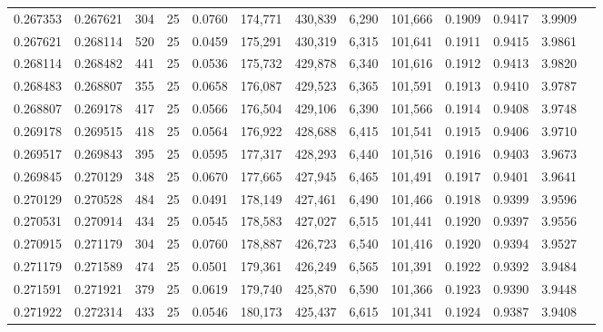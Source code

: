 \begin{tabular}{rrrrrrrrrrrrr}
0.267353 & 0.267621 &   304 &  25 &                                     0.0760 & 174,771 & 430,839 &   6,290 & 101,666 & 0.1909 & 0.9417 & 3.9909 \\
0.267621 & 0.268114 &   520 &  25 &                                     0.0459 & 175,291 & 430,319 &   6,315 & 101,641 & 0.1911 & 0.9415 & 3.9861 \\
0.268114 & 0.268482 &   441 &  25 &                                     0.0536 & 175,732 & 429,878 &   6,340 & 101,616 & 0.1912 & 0.9413 & 3.9820 \\
0.268483 & 0.268807 &   355 &  25 &                                     0.0658 & 176,087 & 429,523 &   6,365 & 101,591 & 0.1913 & 0.9410 & 3.9787 \\
0.268807 & 0.269178 &   417 &  25 &                                     0.0566 & 176,504 & 429,106 &   6,390 & 101,566 & 0.1914 & 0.9408 & 3.9748 \\
0.269178 & 0.269515 &   418 &  25 &                                     0.0564 & 176,922 & 428,688 &   6,415 & 101,541 & 0.1915 & 0.9406 & 3.9710 \\
0.269517 & 0.269843 &   395 &  25 &                                     0.0595 & 177,317 & 428,293 &   6,440 & 101,516 & 0.1916 & 0.9403 & 3.9673 \\
0.269845 & 0.270129 &   348 &  25 &                                     0.0670 & 177,665 & 427,945 &   6,465 & 101,491 & 0.1917 & 0.9401 & 3.9641 \\
0.270129 & 0.270528 &   484 &  25 &                                     0.0491 & 178,149 & 427,461 &   6,490 & 101,466 & 0.1918 & 0.9399 & 3.9596 \\
0.270531 & 0.270914 &   434 &  25 &                                     0.0545 & 178,583 & 427,027 &   6,515 & 101,441 & 0.1920 & 0.9397 & 3.9556 \\
0.270915 & 0.271179 &   304 &  25 &                                     0.0760 & 178,887 & 426,723 &   6,540 & 101,416 & 0.1920 & 0.9394 & 3.9527 \\
0.271179 & 0.271589 &   474 &  25 &                                     0.0501 & 179,361 & 426,249 &   6,565 & 101,391 & 0.1922 & 0.9392 & 3.9484 \\
0.271591 & 0.271921 &   379 &  25 &                                     0.0619 & 179,740 & 425,870 &   6,590 & 101,366 & 0.1923 & 0.9390 & 3.9448 \\
0.271922 & 0.272314 &   433 &  25 &                                     0.0546 & 180,173 & 425,437 &   6,615 & 101,341 & 0.1924 & 0.9387 & 3.9408 \\

\end{tabular}
